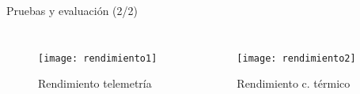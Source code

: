 \begin{frame}{Pruebas y evaluación (2/2)}

\begin{table}[h]
\centering
{}
		\caption{Intervalo de confianza}
\end{table}

\begin{columns}


\begin{figure}[h]
\centering
\texttt{[image: rendimiento1]}
\caption{Rendimiento telemetría}
\end{figure}


\begin{figure}[h]
\centering
\texttt{[image: rendimiento2]}
\caption{Rendimiento c. térmico}
\end{figure}

\end{columns}

\end{frame}
